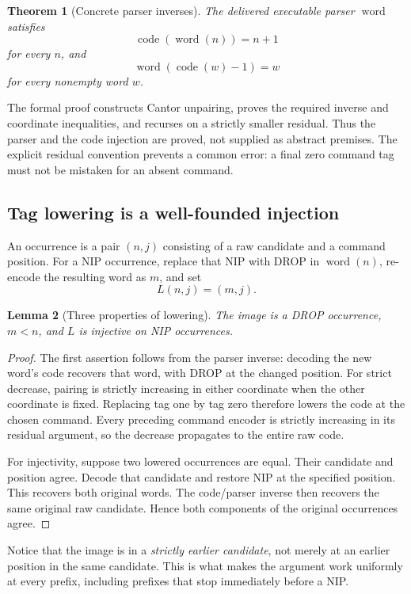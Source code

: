 \documentclass[11pt]{article}
\newtheorem{theorem}{Theorem}[section]
\newtheorem{lemma}[theorem]{Lemma}
\theoremstyle{definition}\newtheorem{definition}[theorem]{Definition}
\begin{document}
\begin{theorem}[Concrete parser inverses]
The delivered executable parser $\operatorname{word}$ satisfies
\[
 \operatorname{code}(\operatorname{word}(n))=n+1
\]
for every $n$, and
\[
 \operatorname{word}(\operatorname{code}(w)-1)=w
\]
for every nonempty word $w$.
\end{theorem}

The formal proof constructs Cantor unpairing, proves the required inverse and
coordinate inequalities, and recurses on a strictly smaller residual. Thus
the parser and the code injection are proved, not supplied as abstract
premises. The explicit residual convention prevents a common error: a final
zero command tag must not be mistaken for an absent command.

\subsection{Tag lowering is a well-founded injection}

An occurrence is a pair $(n,j)$ consisting of a raw candidate and a command
position. For a NIP occurrence, replace that NIP with DROP in
$\operatorname{word}(n)$, re-encode the resulting word as $m$, and set
\[
 L(n,j)=(m,j).
\]

\begin{lemma}[Three properties of lowering]
The image is a DROP occurrence, $m<n$, and $L$ is injective on NIP occurrences.
\end{lemma}

\begin{proof}
The first assertion follows from the parser inverse: decoding the new word's
code recovers that word, with DROP at the changed position. For strict
decrease, pairing is strictly increasing in either coordinate when the other
coordinate is fixed. Replacing tag one by tag zero therefore lowers the code
at the chosen command. Every preceding command encoder is strictly increasing
in its residual argument, so the decrease propagates to the entire raw code.

For injectivity, suppose two lowered occurrences are equal. Their candidate
and position agree. Decode that candidate and restore NIP at the specified
position. This recovers both original words. The code/parser inverse then
recovers the same original raw candidate. Hence both components of the
original occurrences agree.
\end{proof}

Notice that the image is in a \emph{strictly earlier candidate}, not merely
at an earlier position in the same candidate. This is what makes the argument
work uniformly at every prefix, including prefixes that stop immediately
before a NIP.
\end{document}
